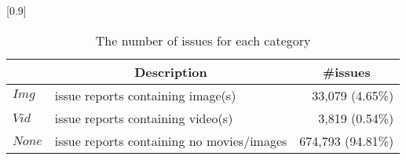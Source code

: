 
\begin{table}[t]
    \begin{center}
    \caption{The number of issues for each category}
    \scalebox{0.9}[0.9]{
    \begin{tabular}{llr}
        \toprule
         & \multicolumn{1}{c}{\textbf{Description}} & \multicolumn{1}{c}{\textbf{\#issues}} \\
        \midrule
        $Img$  & issue reports containing image(s) & 33,079 (4.65\%)\\%
        $Vid$  & issue reports containing video(s) & 3,819 (0.54\%)\\%
        $None$ & issue reports containing no movies/images & 674,793 (94.81\%)\\ 
        \bottomrule
    \end{tabular}
    }
    \label{tab:issue-category}
    \end{center}
    
\end{table}
